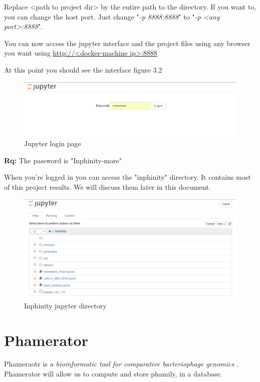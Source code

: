 \documentclass[a4paper,11pt]{report}
\begin{document}
Replace <path to project dir> by the entire path to the directory. If you want to, you can change the host port. Just change "\textit{-p 8888:8888}" to "\textit{-p <any port>:8888}".

You can now access the jupyter interface and the project files using any browser you want using \url{http://<docker-machine ip>:8888}

At this point you should see the interface figure 3.2

\begin{figure}[H] 
	\begin{center}
		\includegraphics[scale=0.45]{img/login_jupyter}
		\caption{Jupyter login page}
	\end{center}
\end{figure}

\textbf{Rq:} The password is "Inphinity-more"

When you're logged in you can access the "inphinity" directory. It contains most of this project results. We will discuss them later in this document.

\begin{figure}[H] 
	\begin{center}
		\includegraphics[scale=0.45]{img/inphinity_jupyter}
		\caption{Inphinity jupyter directory}
	\end{center}
\end{figure}
\newpage
\section{Phamerator}
Phameraotr is \textit{a bioinformatic tool for comparative bacteriophage genomics} \cite{ref4}. Phamerator will allow us to compute and store phamily, in a database. 
\end{document}
